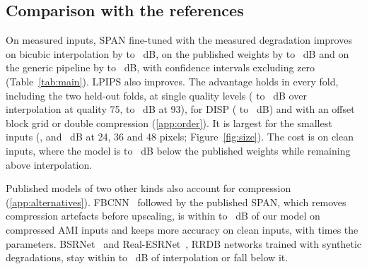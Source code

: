 \begin{table}[t]
\centering
\caption{PSNR-Y (dB) of SPAN on AMI (36-pixel inputs) by training degradation (rows) and test input (columns). Best fine-tuned or published model per column in bold.}
\label{tab:matrix}
\small
{}
\end{table}

\subsection{Comparison with the references}
On measured inputs, SPAN fine-tuned with the measured degradation improves on bicubic interpolation by \EstVsBicMin{} to \EstVsBicMax{}~dB, on the published weights by \EstVsPubMin{} to \EstVsPubMax{}~dB and on the generic pipeline by \EstVsGenMin{} to \EstVsGenMax{}~dB, with confidence intervals excluding zero (Table~\ref{tab:main}). LPIPS also improves. The advantage holds in every fold, including the two held-out folds, at single quality levels (\EstVsBicQLowMin{} to \EstVsBicQLowMax{}~dB over interpolation at quality 75, \EstVsBicQHighMin{} to \EstVsBicQHighMax{}~dB at 93), for DISP (\DispEstVsBicMin{} to \DispEstVsBicMax{}~dB) and with an offset block grid or double compression (\ref{app:order}). It is largest for the smallest inputs (\EstVsBicAmiS{}, \EstVsBicAmiM{} and \EstVsBicAmiL{}~dB at 24, 36 and 48 pixels; Figure~\ref{fig:size}). The cost is on clean inputs, where the model is \EstVsPubCleanMin{} to \EstVsPubCleanMax{}~dB below the published weights while remaining above interpolation.

Published models of two other kinds also account for compression (\ref{app:alternatives}). FBCNN~\cite{jiang2021fbcnn} followed by the published SPAN, which removes compression artefacts before upscaling, is within \RevFbVsEstAmiMin{} to \RevFbVsEstAmiMax{}~dB of our model on compressed AMI inputs and keeps more accuracy on clean inputs, with \RevFbParamsRatio{} times the parameters. BSRNet~\cite{zhang2021bsrgan} and Real-ESRNet~\cite{wang2021realesrgan}, RRDB networks trained with synthetic degradations, stay within \RevBsrVsBicMin{} to \RevBsrVsBicMax{}~dB of interpolation or fall below it.

